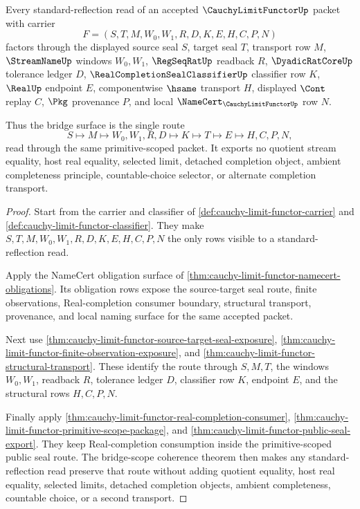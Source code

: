 \begin{theorem}
\label{thm:cauchy-limit-functor-standard-reflection-bridge-surface}
Every standard-reflection read of an accepted $\CauchyLimitFunctorUp$ packet with carrier
$$
F=(S,T,M,W_0,W_1,R,D,K,E,H,C,P,N)
$$
factors through the displayed source seal $S$, target seal $T$, transport row $M$, $\StreamNameUp$ windows $W_0,W_1$, $\RegSeqRatUp$ readback $R$, $\DyadicRatCoreUp$ tolerance ledger $D$, $\RealCompletionSealClassifierUp$ classifier row $K$, $\RealUp$ endpoint $E$, componentwise $\hsame$ transport $H$, displayed $\Cont$ replay $C$, $\Pkg$ provenance $P$, and local $\NameCert_{\CauchyLimitFunctorUp}$ row $N$.

Thus the bridge surface is the single route
$$
S \longmapsto M \longmapsto W_0,W_1,R,D \longmapsto K \longmapsto T \longmapsto E \longmapsto H,C,P,N,
$$
read through the same primitive-scoped packet. It exports no quotient stream equality, host real equality, selected limit, detached completion object, ambient completeness principle, countable-choice selector, or alternate completion transport.
\end{theorem}
\begin{proof}
Start from the carrier and classifier of \autoref{def:cauchy-limit-functor-carrier} and \autoref{def:cauchy-limit-functor-classifier}. They make $S,T,M,W_0,W_1,R,D,K,E,H,C,P,N$ the only rows visible to a standard-reflection read.

Apply the NameCert obligation surface of \autoref{thm:cauchy-limit-functor-namecert-obligations}. Its obligation rows expose the source-target seal route, finite observations, Real-completion consumer boundary, structural transport, provenance, and local naming surface for the same accepted packet.

Next use \autoref{thm:cauchy-limit-functor-source-target-seal-exposure}, \autoref{thm:cauchy-limit-functor-finite-observation-exposure}, and \autoref{thm:cauchy-limit-functor-structural-transport}. These identify the route through $S,M,T$, the windows $W_0,W_1$, readback $R$, tolerance ledger $D$, classifier row $K$, endpoint $E$, and the structural rows $H,C,P,N$.

Finally apply \autoref{thm:cauchy-limit-functor-real-completion-consumer}, \autoref{thm:cauchy-limit-functor-primitive-scope-package}, and \autoref{thm:cauchy-limit-functor-public-seal-export}. They keep Real-completion consumption inside the primitive-scoped public seal route. The bridge-scope coherence theorem then makes any standard-reflection read preserve that route without adding quotient equality, host real equality, selected limits, detached completion objects, ambient completeness, countable choice, or a second transport.
\end{proof}

